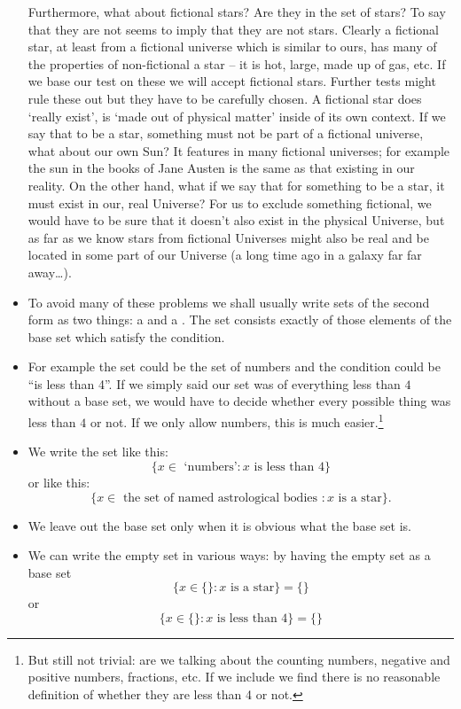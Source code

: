 \begin{itemize}
Furthermore, what about fictional stars? Are they in the set of stars? To say that they are not seems to imply that they are not stars. Clearly a fictional star, at least from a fictional universe which is similar to ours, has many of the properties of non-fictional a star -- it is hot, large, made up of gas, etc. If we base our test on these we will accept fictional stars. Further tests might rule these out but they have to be carefully chosen. A fictional star does `really exist', is `made out of physical matter' inside of its own context. If we say that to be a star, something must not be part of a fictional universe, what about our own Sun? It features in many fictional universes; for example the sun in the books of Jane Austen is the same as that existing in our reality. On the other hand, what if we say that for something to be a star, it must exist in our, real Universe? For us to exclude something fictional, we would have to be sure that it doesn't also exist in the physical Universe, but as far as we know stars from fictional Universes might also be real and be located in some part of our Universe (a long time ago in a galaxy far far away\ldots).
\item
To avoid many of these problems we shall usually write sets of the second form as two things: a  and a . The set consists exactly of those elements of the base set which satisfy the condition.
\item
 For example the set could be the set of numbers and the condition could be ``is less than 4''. If we simply said our set was of everything less than $4$ without a base set, we would have to decide whether every possible thing was less than $4$ or not. If we only allow numbers, this is much easier.\footnote{But still not trivial: are we talking about the counting numbers, negative and positive numbers, fractions, etc. If we include  we find there is no reasonable definition of whether they are less than 4 or not.}
\item
We write the set like this:
\[ \{ x \in \text{ `numbers'} : x \text{ is less than } 4 \} \]
or like this:
\[ \{ x \in \text{ the set of named astrological bodies } : x \text{ is a star} \} .\]
\item
We leave out the base set only when it is obvious what the base set is.
\item
We can write the empty set in various ways: by having the empty set as a base set
\[ \{ x \in \{\} : x \text{ is a star} \} = \{\} \]
or
\[ \{ x \in \{\} : x \text{ is less than } 4 \}  = \{\} \]

\end{itemize}

